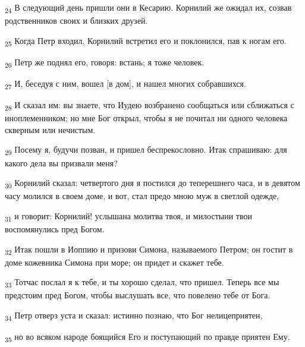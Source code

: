 \begin{tcolorbox}
\textsubscript{24} В следующий день пришли они в Кесарию. Корнилий же ожидал их, созвав родственников своих и близких друзей.
\end{tcolorbox}
\begin{tcolorbox}
\textsubscript{25} Когда Петр входил, Корнилий встретил его и поклонился, пав к ногам его.
\end{tcolorbox}
\begin{tcolorbox}
\textsubscript{26} Петр же поднял его, говоря: встань; я тоже человек.
\end{tcolorbox}
\begin{tcolorbox}
\textsubscript{27} И, беседуя с ним, вошел [в дом], и нашел многих собравшихся.
\end{tcolorbox}
\begin{tcolorbox}
\textsubscript{28} И сказал им: вы знаете, что Иудею возбранено сообщаться или сближаться с иноплеменником; но мне Бог открыл, чтобы я не почитал ни одного человека скверным или нечистым.
\end{tcolorbox}
\begin{tcolorbox}
\textsubscript{29} Посему я, будучи позван, и пришел беспрекословно. Итак спрашиваю: для какого дела вы призвали меня?
\end{tcolorbox}
\begin{tcolorbox}
\textsubscript{30} Корнилий сказал: четвертого дня я постился до теперешнего часа, и в девятом часу молился в своем доме, и вот, стал предо мною муж в светлой одежде,
\end{tcolorbox}
\begin{tcolorbox}
\textsubscript{31} и говорит: Корнилий! услышана молитва твоя, и милостыни твои воспомянулись пред Богом.
\end{tcolorbox}
\begin{tcolorbox}
\textsubscript{32} Итак пошли в Иоппию и призови Симона, называемого Петром; он гостит в доме кожевника Симона при море; он придет и скажет тебе.
\end{tcolorbox}
\begin{tcolorbox}
\textsubscript{33} Тотчас послал я к тебе, и ты хорошо сделал, что пришел. Теперь все мы предстоим пред Богом, чтобы выслушать все, что повелено тебе от Бога.
\end{tcolorbox}
\begin{tcolorbox}
\textsubscript{34} Петр отверз уста и сказал: истинно познаю, что Бог нелицеприятен,
\end{tcolorbox}
\begin{tcolorbox}
\textsubscript{35} но во всяком народе боящийся Его и поступающий по правде приятен Ему.
\end{tcolorbox}

